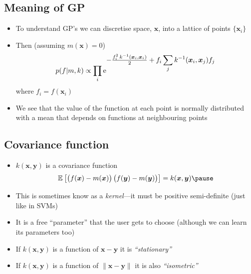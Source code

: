 
\begin{slide}
\section[-1]{Meaning of GP}

\begin{PauseHighLight}
  \begin{itemize}
  \item To understand GP's we can discretise space, $\bm{x}$, into a
    lattice of points $\{\bm{x}_i\}$\pause
  \item Then (assuming $m(\bm{x})=0$)
    \begin{align*}
      p(f|m,k) \propto \prod_i {\rm e}^{{\displaystyle -\tfrac{f_i^2\, k^{-1}(\bm{x}_i,\bm{x}_i)}{
      2} + f_i  \sum_j
      k^{-1}(\bm{x}_i,\bm{x}_j) f_j}}
    \end{align*}
    where $f_i=f(\bm{x}_i)$\pause
  \item We see that the value of the function at each point is normally
    distributed with a mean that depends on functions at neighbouring
    points\pause
  \end{itemize}
\end{PauseHighLight}

\end{slide}




\begin{slide}
\section[-1]{Covariance function}

\begin{PauseHighLight}
  \begin{itemize}
  \item $k(\bm{x},\bm{y})$ is a covariance function
    \begin{align*}
      \av{\left(\strut f(\bm{x})-m(\bm{x})\right)
      \left(\strut f(\bm{y})-m(\bm{y})\right)} = k(\bm{x},\bm{y})\pause
    \end{align*}
  \item This is sometimes know as a \emph{kernel}\pause---it must be positive
    semi-definite\pause{} (just like in SVMs)\pauseb
  \item It is a free ``parameter'' that the user gets to choose (although we
    can learn its parameters too)\pause
  \item If $k(\bm{x},\bm{y})$ is a function of $\bm{x}-\bm{y}$ it is
    \emph{``stationary''}\pause
  \item If $k(\bm{x},\bm{y})$ is a function of $\|\bm{x}-\bm{y}\|$ it is
    also \emph{``isometric''}\pause
  \end{itemize}
\end{PauseHighLight}

\end{slide}

